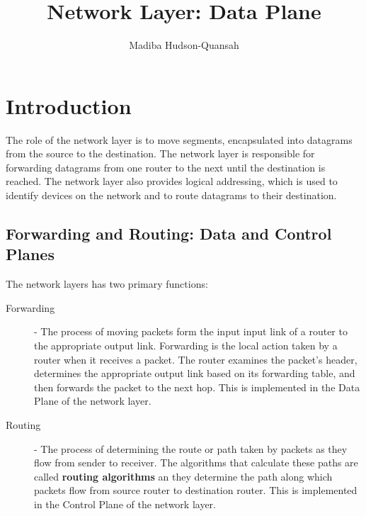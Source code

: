 \documentclass[12pt letter]{report}
\title{\Huge{Network Layer: Data Plane}}
\author{\huge{Madiba Hudson-Quansah}}
\date{}
\begin{document}
\maketitle
\newpage
{}
\tableofcontents
\pagebreak

\chapter{Introduction}

The role of the network layer is to move segments, encapsulated into
datagrams from the source to the destination. The network layer is
responsible for forwarding datagrams from one router to the next
until the destination is reached. The network layer also provides
logical addressing, which is used to identify devices on the network
and to route datagrams to their destination.

\section{Forwarding and Routing: Data and Control Planes}

The network layers has two primary functions:
\begin{description}
  \item[Forwarding]  - The process of moving packets form the input
    input link of a router to the appropriate output link. Forwarding
    is the local action taken by a router when it receives a packet.
    The router examines the packet's header, determines the
    appropriate output link based on its forwarding table, and then
    forwards the packet to the next hop. This is implemented in the
    Data Plane of the network layer.
  \item[Routing] - The process of determining the route or path taken
    by packets as they flow from sender to receiver. The algorithms
    that calculate these paths are called \textbf{routing algorithms}
    an they determine the path along which packets flow from source
    router to destination router. This is implemented in the Control
    Plane of the network layer.
\end{description}

%
%
\end{document}
